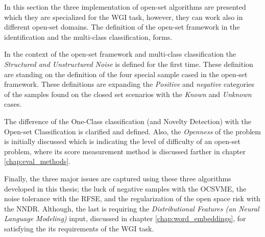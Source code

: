 In this section the three implementation of open-set algorithms are presented which they are specialized for the WGI task, however, they can work also in different open-set domains. The definition of the open-set framework in the identification and the multi-class classification, forms.

In the context of the open-set framework and multi-class classification the \textit{Structured and Unstructured Noise} is defined for the first time. These definition are standing on the definition of the four special sample cased in the open-set framework. These definitions are expanding the \textit{Positive} and \textit{negative} categories of the samples found on the closed set scenarios with the \textit{Known} and \textit{Unknown} cases. 

The difference of the One-Class classification (and Novelty Detection) with the Open-set Classification is clarified and defined. Also, the \textit{Openness} of the problem is initially discussed which is indicating the level of difficulty of an open-set problem, where its score measurement method is discussed farther in chapter \ref{chap:eval_methods}.

Finally, the three major issues are captured using these three algorithms developed in this thesis; the luck of negative samples with the OCSVME, the noise tolerance with the RFSE, and the regularization of the open space risk with the NNDR. Although, the last is requiring the \textit{Distributional Features (an Neural Language Modeling)} input, discussed in chapter \ref{chap:word_embeddings}, for satisfying the its requirements of the WGI task.